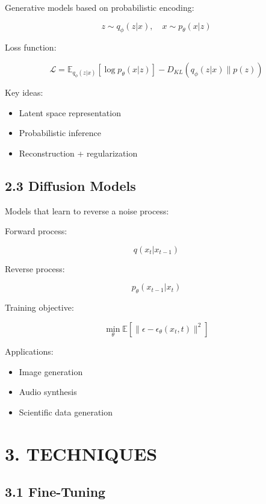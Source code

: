 Generative models based on probabilistic encoding:

\[
z \sim q_\phi(z|x), \quad x \sim p_\theta(x|z)
\]

Loss function:

\[
\mathcal{L} = \mathbb{E}_{q_\phi(z|x)}[\log p_\theta(x|z)] - D_{KL}(q_\phi(z|x) \| p(z))
\]

Key ideas:

\begin{itemize}
\item Latent space representation
\item Probabilistic inference
\item Reconstruction + regularization
\end{itemize}

\vspace{0.3cm}

\subsection*{2.3 Diffusion Models}

Models that learn to reverse a noise process:

Forward process:

\[
q(x_t | x_{t-1})
\]

Reverse process:

\[
p_\theta(x_{t-1} | x_t)
\]

Training objective:

\[
\min_\theta \mathbb{E} \left[ \| \epsilon - \epsilon_\theta(x_t, t) \|^2 \right]
\]

Applications:

\begin{itemize}
\item Image generation
\item Audio synthesis
\item Scientific data generation
\end{itemize}

\vspace{0.5cm}

\section*{3. TECHNIQUES}

\subsection*{3.1 Fine-Tuning}

